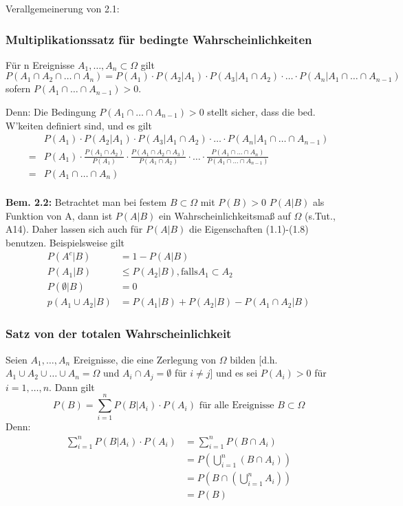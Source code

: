 \documentclass[a4paper,11pt]{article}
\begin{document}
\noindent Verallgemeinerung von 2.1:

\subsubsection{Multiplikationssatz für bedingte Wahrscheinlichkeiten}
\noindent Für n Ereignisse $A_1,\dots,A_n\subset\Omega$ gilt 
\[P(A_1\cap A_2\cap\dots\cap A_n)=P(A_1)\cdot P(A_2|A_1)\cdot P(A_3|A_1\cap A_2)\cdot\dots\cdot P(A_n|A_1\cap\dots\cap A_{n-1})\] 
sofern $P(A_1\cap\dots\cap A_{n-1})>0$.

\vspace{6pt}
\noindent Denn: Die Bedingung  $P(A_1\cap\dots\cap A_{n-1})>0$ stellt sicher, dass die bed. W'keiten definiert sind, 
und es gilt 
\begin{align*}
& P(A_1)\cdot P(A_2|A_1)\cdot P(A_3|A_1\cap A_2)\cdot\dots\cdot P(A_n|A_1\cap\dots\cap A_{n-1})\\
=& P(A_1)\cdot \frac{P(A_1\cap A_2)}{P(A_1)}\cdot \frac{P(A_1\cap A_2\cap A_3)}{P(A_1\cap A_2)}\cdot\dots\cdot \frac{P(A_1\cap\dots\cap A_n)}{P(A_1\cap\dots\cap A_{n-1})}\\
=& P(A_1\cap\dots\cap A_n)\\
\end{align*}

\vspace{6pt}
\noindent\textbf{Bem. 2.2:} Betrachtet man bei festem $B\subset\Omega$ mit $P(B)>0$ $P(A|B)$ als Funktion von A, dann ist $P(A|B)$ ein Wahrscheinlichkeitsmaß auf $\Omega$ (s.Tut., A14).
\newline Daher lassen sich auch für $P(A|B)$ die Eigenschaften (1.1)-(1.8) benutzen. Beispielsweise gilt
\begin{align*}
P(A^c|B) &= 1-P(A|B)\\
P(A_1|B) &\leq P(A_2|B) \mathrm{, falls } A_1\subset A_2\\
P(\emptyset|B) &= 0\\
p(A_1\cup A_2|B)&=P(A_1|B)+P(A_2|B)-P(A_1\cap A_2|B)
\end{align*}

\subsubsection{Satz von der totalen Wahrscheinlichkeit}
\noindent Seien $A_1,\dots,A_n$ Ereignisse, die eine Zerlegung von $\Omega$ bilden [d.h. $A_1\cup A_2\cup\dots\cup A_n = \Omega$ und $A_i\cap A_j = \emptyset$ für $i\neq j$]
und es sei $P(A_i)>0$ für $i=1,\dots,n$. Dann gilt
\[P(B)=\sum_{i=1}^{n}P(B|A_i)\cdot P(A_i)\text{ für alle Ereignisse }B\subset\Omega\]
Denn: 
\begin{align*}
\sum_{i=1}^{n}P(B|A_i)\cdot P(A_i) &= \sum_{i=1}^{n}P(B\cap A_i)\\
&= P(\bigcup_{i=1}^{n}(B\cap A_i))\\
&= P(B\cap(\bigcup_{i=1}^{n}A_i))\\
&= P(B)
\end{align*}
\end{document}
